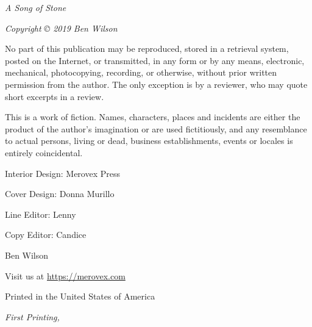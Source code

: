 \documentclass[10pt,]{book}
\begin{document}
  \pagestyle{empty}
    \vspace*{\fill}

    \par\noindent\emph{A Song of Stone}\newline
    \par\noindent\emph{Copyright © 2019 Ben Wilson}\newline

    \footnotesize
    \par\noindent No part of this publication may be reproduced, stored in a retrieval
system, posted on the Internet, or transmitted, in any form or by any
means, electronic, mechanical, photocopying, recording, or otherwise,
without prior written permission from the author. The only exception is
by a reviewer, who may quote short excerpts in a review.\newline

    \par\noindent This is a work of fiction. Names, characters, places and incidents are
either the product of the author's imagination or are used fictitiously,
and any resemblance to actual persons, living or dead, business
establishments, events or locales is entirely coincidental.\newline

    \par\noindent Interior Design: Merovex Press %
        \par\noindent Cover Design: Donna Murillo
        \par\noindent Line Editor: Lenny
        \par\noindent Copy Editor: Candice
    \newline

    \par\noindent\normalsize Ben Wilson
        \par\noindent Visit us at \url{https://merovex.com}\newline
    
    \par\noindent Printed in the United States of America
    \newline

      \par\noindent\textit{First Printing, \usmonthyear{}}
      \newline
    
\end{document}
